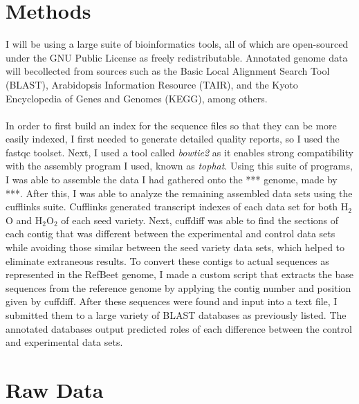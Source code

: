 \documentclass{article}
\begin{document}
\section{Methods}
	I will be using a large suite of bioinformatics tools, all of which are open-sourced under the GNU Public License as freely redistributable. Annotated genome data will becollected from sources such as the Basic Local Alignment Search Tool (BLAST), Arabidopsis Information Resource (TAIR), and the Kyoto Encyclopedia of Genes and Genomes (KEGG), among others.\\\\
	In order to first build an index for the sequence files so that they can be more easily indexed, I first needed to generate detailed quality reports, so I used the fastqc toolset. Next, I used a tool called \emph{bowtie2} as it enables strong compatibility with the assembly program I used, known as \emph{tophat}. Using this suite of programs, I was able to assemble the data I had gathered onto the *** genome, made by ***. After this, I was able to analyze the remaining assembled data sets using the cufflinks suite. Cufflinks generated transcript indexes of each data set for both H$_{2}$O and H$_{2}$O$_{2}$ of each seed variety. Next, cuffdiff was able to find the sections of each contig that was different between the experimental and control data sets while avoiding those similar between the seed variety data sets, which helped to eliminate extraneous results. To convert these contigs to actual sequences as represented in the RefBeet genome, I made a custom script that extracts the base sequences from the reference genome by applying the contig number and position given by cuffdiff. After these sequences were found and input into a text file, I submitted them to a large variety of BLAST databases as previously listed. The annotated databases output predicted roles of each difference between the control and experimental data sets.

\section{Raw Data}
\end{document}
